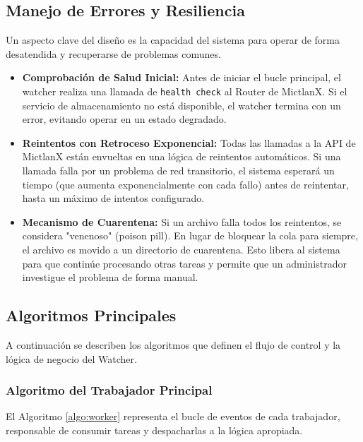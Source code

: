 \subsection{Manejo de Errores y Resiliencia}
Un aspecto clave del diseño es la capacidad del sistema para operar de forma desatendida y recuperarse de problemas comunes.
\begin{itemize}
    \item \textbf{Comprobación de Salud Inicial:} Antes de iniciar el bucle principal, el watcher realiza una llamada de \texttt{health check} al Router de MictlanX. Si el servicio de almacenamiento no está disponible, el watcher termina con un error, evitando operar en un estado degradado.
    \item \textbf{Reintentos con Retroceso Exponencial:} Todas las llamadas a la API de MictlanX están envueltas en una lógica de reintentos automáticos. Si una llamada falla por un problema de red transitorio, el sistema esperará un tiempo (que aumenta exponencialmente con cada fallo) antes de reintentar, hasta un máximo de intentos configurado.
    \item \textbf{Mecanismo de Cuarentena:} Si un archivo falla todos los reintentos, se considera "venenoso" (poison pill). En lugar de bloquear la cola para siempre, el archivo es movido a un directorio de cuarentena. Esto libera al sistema para que continúe procesando otras tareas y permite que un administrador investigue el problema de forma manual.
\end{itemize}

\subsection{Algoritmos Principales}
A continuación se describen los algoritmos que definen el flujo de control y la lógica de negocio del Watcher.

\subsubsection{Algoritmo del Trabajador Principal}
El Algoritmo \ref{algo:worker} representa el bucle de eventos de cada trabajador, responsable de consumir tareas y despacharlas a la lógica apropiada.

